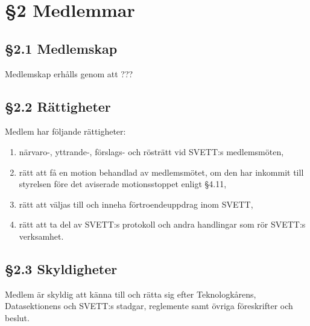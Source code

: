\section*{\S2 Medlemmar}

\subsection*{\S2.1 Medlemskap}
{}

Medlemskap erhålls genom att ???

\subsection*{\S2.2 Rättigheter}

Medlem har följande rättigheter:
\begin{enumerate}[label=\roman*)]
	\item närvaro-, yttrande-, förslags- och rösträtt vid SVETT:s medlemsmöten,
	\item rätt att få en motion behandlad av medlemsmötet, om den har inkommit till
	styrelsen före det aviserade motionsstoppet enligt \S4.11,
	\item rätt att väljas till och inneha förtroendeuppdrag inom SVETT,
	\item rätt att ta del av SVETT:s protokoll och andra handlingar som rör SVETT:s 
	verksamhet.
\end{enumerate}

\subsection*{\S2.3 Skyldigheter}

Medlem är skyldig att känna till och rätta sig efter Teknologkårens,
Datasektionens och SVETT:s stadgar, reglemente samt övriga föreskrifter och beslut.
